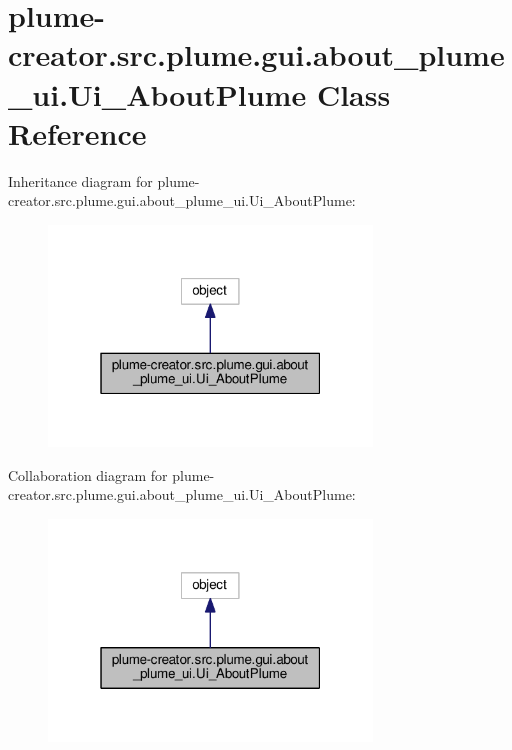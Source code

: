 \hypertarget{classplume-creator_1_1src_1_1plume_1_1gui_1_1about__plume__ui_1_1_ui___about_plume}{}\section{plume-\/creator.src.\+plume.\+gui.\+about\+\_\+plume\+\_\+ui.\+Ui\+\_\+\+About\+Plume Class Reference}
\label{classplume-creator_1_1src_1_1plume_1_1gui_1_1about__plume__ui_1_1_ui___about_plume}


Inheritance diagram for plume-\/creator.src.\+plume.\+gui.\+about\+\_\+plume\+\_\+ui.\+Ui\+\_\+\+About\+Plume\+:\nopagebreak
\begin{figure}[H]
\begin{center}
\leavevmode
\includegraphics[width=244pt]{classplume-creator_1_1src_1_1plume_1_1gui_1_1about__plume__ui_1_1_ui___about_plume__inherit__graph}
\end{center}
\end{figure}


Collaboration diagram for plume-\/creator.src.\+plume.\+gui.\+about\+\_\+plume\+\_\+ui.\+Ui\+\_\+\+About\+Plume\+:\nopagebreak
\begin{figure}[H]
\begin{center}
\leavevmode
\includegraphics[width=244pt]{classplume-creator_1_1src_1_1plume_1_1gui_1_1about__plume__ui_1_1_ui___about_plume__coll__graph}
\end{center}
\end{figure}
